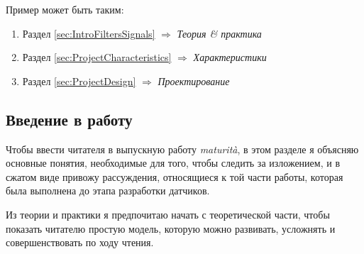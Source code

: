 \documentclass[a4paper, 10pt, final]{article} %
\begin{document}
    \begin{samepage}
        \noindent Пример может быть таким:
        \begin{enumerate}[label=\emph{(\roman*)}]
            \item Раздел \ref{sec:IntroFiltersSignals} $\Rightarrow$ \emph{Теория \& практика}
            \item Раздел \ref{sec:ProjectCharacteristics} $\Rightarrow$ \emph{Характеристики}
            \item Раздел \ref{sec:ProjectDesign} $\Rightarrow$ \emph{Проектирование}
        \end{enumerate}
    \end{samepage}

    \subsection{Введение в работу}\label{sec:IntroReader}
    Чтобы ввести читателя в выпускную работу \emph{maturit\`{a}}, в этом разделе я объясняю основные понятия, необходимые для того, чтобы следить за изложением, и в сжатом виде привожу рассуждения, относящиеся к той части работы, которая была выполнена до этапа разработки датчиков.

    Из теории и практики я предпочитаю начать с теоретической части, чтобы показать читателю простую модель, которую можно развивать, усложнять и совершенствовать по ходу чтения.
    
\end{document}
